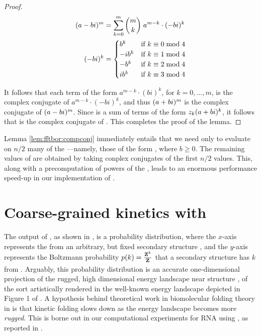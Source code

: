 \begin{proof}
\begin{align}
\begin{split}
(a-bi)^m &= \sum_{k=0}^m \binom{m}{k}\; a^{m-k} \cdot (-bi)^k \\
(-bi)^k &=
\begin{cases}
b^k   & \text{if $k \equiv 0 \bmod 4$} \\
-ib^k & \text{if $k \equiv 1 \bmod 4$} \\
-b^k  & \text{if $k \equiv 2 \bmod 4$} \\
ib^k  & \text{if $k \equiv 3 \bmod 4$} \\
\end{cases}
\end{split}
\end{align}

It follows that each term of the form
$a^{m-k} \cdot (bi)^k$, for $k=0,\dots,m$, is the complex conjugate of
$a^{m-k} \cdot (-bi)^k$, and thus $(a+bi)^m$ is the complex conjugate of
$(a-bi)^m$. Since \emZof{}{\aPbi} is a sum of terms of the form $z_k (a+bi)^k$,
it follows that \emZof{}{\aMbi} is the complex conjugate of \emZof{}{\aPbi}.
This completes the proof of the lemma.

\end{proof}

Lemma \ref{lem:fftbor:compconj} immediately entails that we need only to evaluate \fullZx on $n/2$
many of the \nRoUs---namely, those of the form
\aPbi, where $b \geq 0$. The remaining values of \fullZx are obtained by
taking conplex conjugates of the first $n/2$ values. This, along with a
precomputation of powers of the \nRoUs, leads to an
enormous performance speed-up in our implementation of \fftbor.

\section{Coarse-grained kinetics with \fftbor}
\label{sec:fftbor:kinetics}

The output of \fftbor, as shown in
, is a probability distribution,
where the $x$-axis represents the \bpd from an arbitrary,
but fixed secondary structure \strSt, and the $y$-axis represents the
Boltzmann probability $p(k) = \frac{{\bf Z}^{k}_{}}{{\bf Z}^{}_{}}$ that a secondary structure
has \bpd $k$ from \strSt. Arguably, this probability distribution
is an accurate one-dimensional projection of the rugged, high dimensional energy
landscape near structure \strSt,
of the sort artistically rendered in the well-known
energy landscape depicted in Figure 1 of \citep{wolynes.ptam05}.
A hypothesis behind theoretical work in biomolecular folding theory in
\citep{bryngelson.p95}
is that kinetic folding slows down as the energy landscape becomes more
{\em rugged}. This is borne out in our computational experiments for RNA
using \fftbor, as reported
in .

